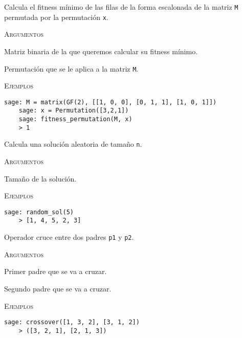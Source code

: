 \begin{description}[leftmargin=1em, font=\normalfont\ttfamily, style=nextline]
  Calcula el fitness mínimo de las filas de la forma escalonada de la matriz \texttt{M} permutada por la permutación \texttt{x}.

  \textsc{Argumentos}
  \begin{description}[font=\normalfont\ttfamily]
    \item[M] Matriz binaria de la que queremos calcular su fitness mínimo.
    \item[x] Permutación que se le aplica a la matriz \texttt{M}.
  \end{description}

  \textsc{Ejemplos}
  \begin{lstlisting}[gobble=4]
    sage: M = matrix(GF(2), [[1, 0, 0], [0, 1, 1], [1, 0, 1]])
    sage: x = Permutation([3,2,1])
    sage: fitness_permutation(M, x)
    > 1
  \end{lstlisting}

  \item[random\_sol(n)]

  Calcula una solución aleatoria de tamaño \texttt{n}.

  \textsc{Argumentos}
  \begin{description}[font=\normalfont\ttfamily]
    \item[n] Tamaño de la solución.
  \end{description}

  \textsc{Ejemplos}
  \begin{lstlisting}[gobble=4]
    sage: random_sol(5)
    > [1, 4, 5, 2, 3]
  \end{lstlisting}

  \item[crossover(p1, p2)]

  Operador cruce entre dos padres \texttt{p1} y \texttt{p2}.

  \textsc{Argumentos}
  \begin{description}[font=\normalfont\ttfamily]
    \item[p1] Primer padre que se va a cruzar.
    \item[p2] Segundo padre que se va a cruzar. 
  \end{description}

  \textsc{Ejemplos}
  \begin{lstlisting}[gobble=4]
    sage: crossover([1, 3, 2], [3, 1, 2])
    > ([3, 2, 1], [2, 1, 3])
  \end{lstlisting}

  \item[mutation(p)]


\end{description}
